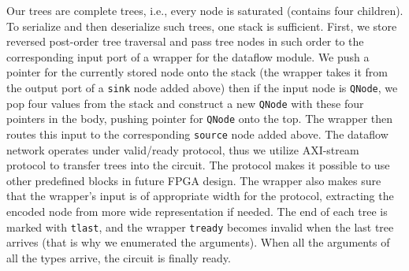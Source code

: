 Our trees are complete trees, i.e., every node is saturated (contains four children). To serialize and then deserialize such trees, one stack is sufficient. First, we store reversed post-order tree traversal and pass tree nodes in such order to the corresponding input port of a wrapper for the dataflow module.  We push a pointer for the currently stored node onto the stack (the wrapper takes it from the output port of a \texttt{sink} node added above) then if the input node is \texttt{QNode}, we pop four values from the stack and construct a new \texttt{QNode} with these four pointers in the body, pushing pointer for \texttt{QNode} onto the top. The wrapper then routes this input to the corresponding \texttt{source} node added above. The dataflow network operates under valid/ready protocol, thus we utilize AXI-stream~\cite{axi-stream} protocol to transfer trees into the circuit. The protocol makes it possible to use other predefined blocks in future FPGA design. The wrapper also makes sure that the wrapper's input is of appropriate width for the protocol, extracting the encoded node from more wide representation if needed. The end of each tree is marked with \texttt{tlast}, and the wrapper \texttt{tready} becomes invalid when the last tree arrives (that is why we enumerated the arguments). When all the arguments of all the types arrive, the circuit is finally ready.

